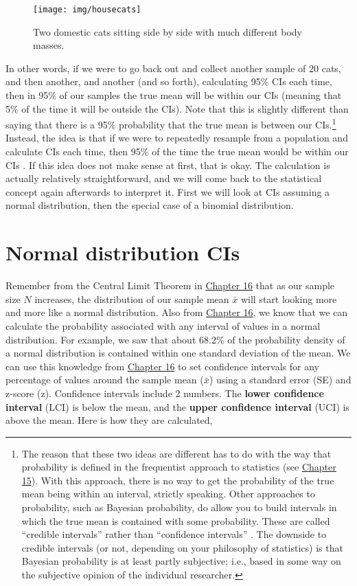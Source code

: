 \documentclass[
]{scrbook}
\begin{document}
\begin{figure}
\texttt{[image: img/housecats]} \caption{Two domestic cats sitting side by side with much different body masses.}\label{fig:unnamed-chunk-84}
\end{figure}

In other words, if we were to go back out and collect another sample of 20 cats, and then another, and another (and so forth), calculating 95\% CIs each time, then in 95\% of our samples the true mean will be within our CIs (meaning that 5\% of the time it will be outside the CIs).
Note that this is slightly different than saying that there is a 95\% probability that the true mean is between our CIs.\footnote{The reason that these two ideas are different has to do with the way that probability is defined in the frequentist approach to statistics (see \protect\hyperlink{Chapter_15}{Chapter 15}). With this approach, there is no way to get the probability of the true mean being within an interval, strictly speaking. Other approaches to probability, such as Bayesian probability, do allow you to build intervals in which the true mean is contained with some probability. These are called ``credible intervals'' rather than ``confidence intervals'' \citep[e.g.,][]{Ellison2004}. The downside to credible intervals (or not, depending on your philosophy of statistics) is that Bayesian probability is at least partly subjective; i.e., based in some way on the subjective opinion of the individual researcher.}
Instead, the idea is that if we were to repeatedly resample from a population and calculate CIs each time, then 95\% of the time the true mean would be within our CIs \citep{Sokal1995}.
If this idea does not make sense at first, that is okay.
The calculation is actually relatively straightforward, and we will come back to the statistical concept again afterwards to interpret it.
First we will look at CIs assuming a normal distribution, then the special case of a binomial distribution.

\hypertarget{normal-distribution-cis}{%
\section{Normal distribution CIs}\label{normal-distribution-cis}}

Remember from the Central Limit Theorem in \protect\hyperlink{Chapter_16}{Chapter 16} that as our sample size \(N\) increases, the distribution of our sample mean \(\bar{x}\) will start looking more and more like a normal distribution.
Also from \protect\hyperlink{Chapter_16}{Chapter 16}, we know that we can calculate the probability associated with any interval of values in a normal distribution.
For example, we saw that about 68.2\% of the probability density of a normal distribution is contained within one standard deviation of the mean.
We can use this knowledge from \protect\hyperlink{Chapter_16}{Chapter 16} to set confidence intervals for any percentage of values around the sample mean (\(\bar{x}\)) using a standard error (SE) and z-score (z).
Confidence intervals include 2 numbers.
The \textbf{lower confidence interval} (LCI) is below the mean, and the \textbf{upper confidence interval} (UCI) is above the mean.
Here is how they are calculated,
\end{document}
